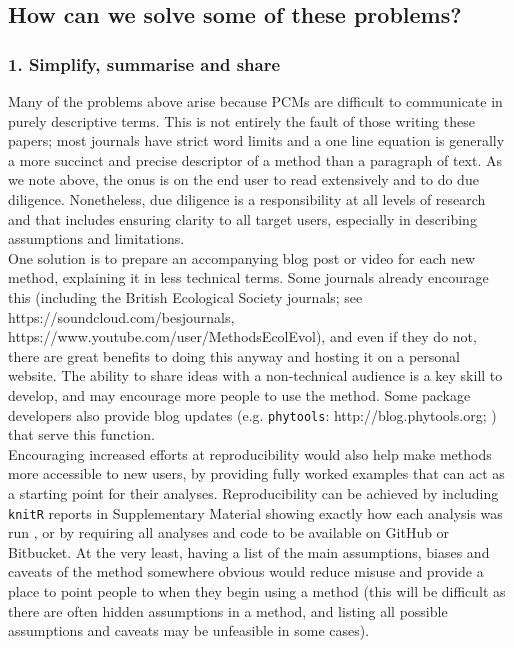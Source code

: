 \documentclass[a4paper,12pt]{article}
\begin{document}
\subsection{How can we solve some of these problems?}
  \subsubsection{1. Simplify, summarise and share}
    Many of the problems above arise because PCMs are difficult to communicate in purely descriptive terms.
    This is not entirely the fault of those writing these papers; most journals have strict word limits and a one line equation is generally a more succinct and precise descriptor of a method than a paragraph of text. 
    As we note above, the onus is on the end user to read extensively and to do due diligence.
    Nonetheless, due diligence is a responsibility at all levels of research and that includes ensuring clarity to all target users, especially in describing assumptions and limitations.\\

    One solution is to prepare an accompanying blog post or video for each new method, explaining it in less technical terms. 
    Some journals already encourage this (including the British Ecological Society journals; see https://soundcloud.com/besjournals, https://www.youtube.com/user/MethodsEcolEvol), and even if they do not, there are great benefits to doing this anyway and hosting it on a personal website. 
    The ability to share ideas with a non-technical audience is a key skill to develop, and may encourage more people to use the method.
    Some package developers also provide blog updates (e.g. \texttt{phytools}: http://blog.phytools.org; \citealp{revell2012phytools}) that serve this function. \\

    Encouraging increased efforts at reproducibility would also help make methods more accessible to new users, by providing fully worked examples that can act as a starting point for their analyses.
    Reproducibility can be achieved by including \texttt{knitR} \citep{Xie:2015aa} reports in Supplementary Material showing exactly how each analysis was run \citep[e.g.][]{fitzjohn2014much}, or by requiring all analyses and code to be available on GitHub or Bitbucket. 
    At the very least, having a list of the main assumptions, biases and caveats of the method somewhere obvious would reduce misuse and provide a place to point people to when they begin using a method (this will be difficult as there are often hidden assumptions in a method, and listing all possible assumptions and caveats may be unfeasible in some cases).\\
\end{document}
